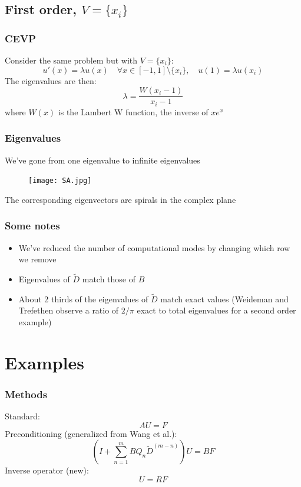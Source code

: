 \documentclass[handout]{beamer}
\begin{document}
\subsection{First order, $V = \{x_i\}$}

\begin{frame}
\frametitle{CEVP}
Consider the same problem but with $V = \{ x_i \}$:
\begin{equation*}
u'(x) = \lambda u(x) \quad \forall x \in [-1,1]\setminus \{x_i\}, \quad u(1) = \lambda u(x_i)
\end{equation*}
The eigenvalues are then:
\begin{equation*}
\lambda = \frac{W(x_i - 1)}{x_i - 1}
\end{equation*}
where $W(x)$ is the Lambert W function, the inverse of $x e^x$
\end{frame}

\begin{frame}
\frametitle{Eigenvalues}
We've gone from one eigenvalue to infinite eigenvalues
\begin{figure}
\texttt{[image: SA.jpg]}
\end{figure}
The corresponding eigenvectors are spirals in the complex plane
\end{frame}

\begin{frame}
\frametitle{Some notes}
\begin{itemize}
\item We've reduced the number of computational modes by changing which row we remove
\item Eigenvalues of $\tilde{D}$ match those of $B$
\item About 2 thirds of the eigenvalues of $\tilde{D}$ match exact values (Weideman and Trefethen observe a ratio of $2/\pi$ exact to total eigenvalues for a second order example)
\end{itemize}
\end{frame}

\section{Examples}

\begin{frame}
\frametitle{Methods}
Standard:
\begin{equation*}
A U = F
\end{equation*}
Preconditioning (generalized from Wang et al.):
\begin{equation*}
\left ( I + \sum_{n=1}^m B Q_n \tilde{D}^{(m-n)} \right ) U = B F
\end{equation*}
Inverse operator (new):
\begin{equation*}
U = R F
\end{equation*}
\end{frame}
\end{document}
